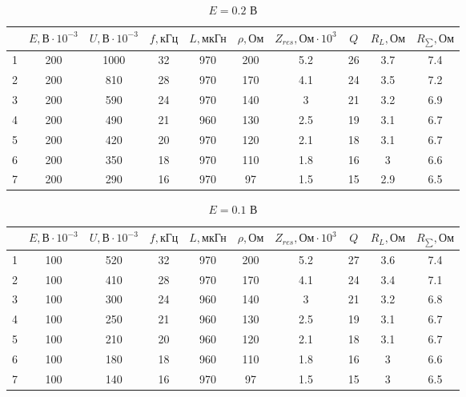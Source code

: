 \documentclass[a4paper, 12pt]{article}%
\begin{document}
\begin{table}[!ht]
\center
\caption{$E=0.2$ В}
\begin{tabular}{|c|c|c|c|c|c|c|c|c|c|}
\hline
\rowcolor[HTML]{C0C0C0}
 & $E, \text{В}\cdot 10^{-3} $ & $U, \text{В}\cdot 10^{-3} $ & $f, \text{кГц}$ & $L, \text{мкГн}$ & $\rho, \text{Ом}$ & $Z_{res}, \text{Ом}\cdot 10^{3} $ & $Q$ & $R_L, \text{Ом}$ & $R_{\sum}, \text{Ом}$ \\ \hline
\cellcolor[HTML]{C0C0C0} 1 & 200 & 1000 & 32 & 970 & 200 & 5.2 & 26 & 3.7 & 7.4 \\ \hline
\rowcolor[HTML]{EFEFEF} 
\cellcolor[HTML]{C0C0C0} 2 & 200 & 810 & 28 & 970 & 170 & 4.1 & 24 & 3.5 & 7.2 \\ \hline
\cellcolor[HTML]{C0C0C0} 3 & 200 & 590 & 24 & 970 & 140 & 3 & 21 & 3.2 & 6.9 \\ \hline
\rowcolor[HTML]{EFEFEF} 
\cellcolor[HTML]{C0C0C0} 4 & 200 & 490 & 21 & 960 & 130 & 2.5 & 19 & 3.1 & 6.7 \\ \hline
\cellcolor[HTML]{C0C0C0} 5 & 200 & 420 & 20 & 970 & 120 & 2.1 & 18 & 3.1 & 6.7 \\ \hline
\rowcolor[HTML]{EFEFEF} 
\cellcolor[HTML]{C0C0C0} 6 & 200 & 350 & 18 & 970 & 110 & 1.8 & 16 & 3 & 6.6 \\ \hline
\cellcolor[HTML]{C0C0C0} 7 & 200 & 290 & 16 & 970 & 97 & 1.5 & 15 & 2.9 & 6.5 \\ \hline
\end{tabular}
\end{table}



\begin{table}[!ht]
\center
\caption{$E=0.1$ В}
\begin{tabular}{|c|c|c|c|c|c|c|c|c|c|}
\hline
\rowcolor[HTML]{C0C0C0}
 & $E, \text{В}\cdot 10^{-3} $ & $U, \text{В}\cdot 10^{-3} $ & $f, \text{кГц}$ & $L, \text{мкГн}$ & $\rho, \text{Ом}$ & $Z_{res}, \text{Ом}\cdot 10^{3} $ & $Q$ & $R_L, \text{Ом}$ & $R_{\sum}, \text{Ом}$ \\ \hline
\cellcolor[HTML]{C0C0C0} 1 & 100 & 520 & 32 & 970 & 200 & 5.2 & 27 & 3.6 & 7.4 \\ \hline
\rowcolor[HTML]{EFEFEF} 
\cellcolor[HTML]{C0C0C0} 2 & 100 & 410 & 28 & 970 & 170 & 4.1 & 24 & 3.4 & 7.1 \\ \hline
\cellcolor[HTML]{C0C0C0} 3 & 100 & 300 & 24 & 960 & 140 & 3 & 21 & 3.2 & 6.8 \\ \hline
\rowcolor[HTML]{EFEFEF} 
\cellcolor[HTML]{C0C0C0} 4 & 100 & 250 & 21 & 960 & 130 & 2.5 & 19 & 3.1 & 6.7 \\ \hline
\cellcolor[HTML]{C0C0C0} 5 & 100 & 210 & 20 & 960 & 120 & 2.1 & 18 & 3.1 & 6.7 \\ \hline
\rowcolor[HTML]{EFEFEF} 
\cellcolor[HTML]{C0C0C0} 6 & 100 & 180 & 18 & 960 & 110 & 1.8 & 16 & 3 & 6.6 \\ \hline
\cellcolor[HTML]{C0C0C0} 7 & 100 & 140 & 16 & 970 & 97 & 1.5 & 15 & 3 & 6.5 \\ \hline
\end{tabular}
\end{table}
\end{document}
